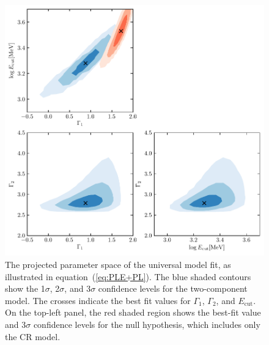 \documentclass[doublespace,nopageskip]{VTthesis}
\begin{document}
\begin{figure}
    \centering
    \includegraphics[width=\textwidth]{Figures/Globular/globalfit.pdf}
    \caption{The projected parameter space of the universal model fit, as illustrated in equation~(\ref{eq:PLE+PL}). The blue shaded contours show the 1$\sigma$, 2$\sigma$, and 3$\sigma$ confidence levels for the two-component model. The crosses indicate the best fit values for $\Gamma_1$, $\Gamma_2$, and $E_\mathrm{cut}$. On the top-left panel, the red shaded region shows the best-fit value and 3$\sigma$ confidence levels for the null hypothesis, which includes only the CR model.}
    \label{fig:global}
\end{figure}
\end{document}
